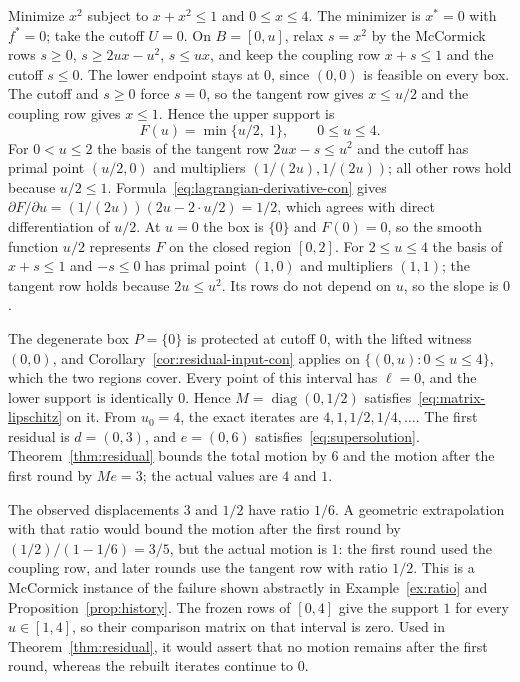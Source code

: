 \begin{example}\label{ex:switch-con}
Minimize $x^2$ subject to $x+x^2\le1$ and $0\le x\le4$. The minimizer is
$x^*=0$ with $f^*=0$; take the cutoff $U=0$. On $B=[0,u]$, relax $s=x^2$
by the McCormick rows $s\ge0$, $s\ge2ux-u^2$, $s\le ux$, and keep the
coupling row $x+s\le1$ and the cutoff $s\le0$. The lower endpoint stays at
$0$, since $(0,0)$ is feasible on every box. The cutoff and $s\ge0$ force
$s=0$, so the tangent row gives $x\le u/2$ and the coupling row gives
$x\le1$. Hence the upper support is
\[
 F(u)=\min\{u/2,\ 1\},\qquad 0\le u\le4 .
\]
For $0<u\le2$ the basis of the tangent row $2ux-s\le u^2$ and the cutoff
has primal point $(u/2,0)$ and multipliers $(1/(2u),1/(2u))$; all other rows
hold because $u/2\le1$. Formula~\eqref{eq:lagrangian-derivative-con} gives
$\partial F/\partial u=(1/(2u))(2u-2\cdot u/2)=1/2$, which agrees with direct
differentiation of $u/2$. At $u=0$ the box is $\{0\}$ and $F(0)=0$, so the
smooth function $u/2$ represents $F$ on the closed region $[0,2]$. For
$2\le u\le4$ the basis of $x+s\le1$ and $-s\le0$ has primal point $(1,0)$
and multipliers $(1,1)$; the tangent row holds because $2u\le u^2$. Its
rows do not depend on $u$, so the slope is $0$.

The degenerate box $P=\{0\}$ is protected at cutoff $0$, with the lifted
witness $(0,0)$, and Corollary~\ref{cor:residual-input-con} applies on
$\{(0,u):0\le u\le4\}$, which the two regions cover. Every point of this
interval has $\ell=0$, and the lower support is identically $0$. Hence
$M=\operatorname{diag}(0,1/2)$ satisfies~\eqref{eq:matrix-lipschitz} on it.
From $u_0=4$, the exact iterates are $4,1,1/2,1/4,\ldots$. The first
residual is $d=(0,3)$, and $e=(0,6)$ satisfies~\eqref{eq:supersolution}.
Theorem~\ref{thm:residual} bounds the total motion by $6$ and the
motion after the first round by $Me=3$; the actual values are $4$ and $1$.

The observed displacements $3$ and $1/2$ have ratio $1/6$. A geometric
extrapolation with that ratio would bound the motion after the first round
by $(1/2)/(1-1/6)=3/5$, but the actual motion is $1$: the first round used
the coupling row, and later rounds use the tangent row with ratio $1/2$.
This is a McCormick instance of the failure shown abstractly in
Example~\ref{ex:ratio} and Proposition~\ref{prop:history}. The frozen rows
of $[0,4]$ give the support $1$ for every $u\in[1,4]$, so their comparison
matrix on that interval is zero. Used in Theorem~\ref{thm:residual},
it would assert that no motion remains after the first round, whereas the
rebuilt iterates continue to $0$.
\end{example}

